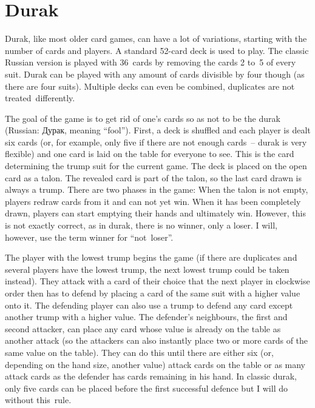 \documentclass[a4paper,titlepage]{article}
\begin{document}
\newpage

\section{Durak}

Durak, like most older card games, can have a lot of variations, starting with the number of cards and players. A standard 52-card deck is used to play. The classic Russian version is played with 36~cards by removing the cards 2 to~5 of every suit. Durak can be played with any amount of cards divisible by four though (as there are four suits). Multiple decks can even be combined, duplicates are not treated~differently.

The goal of the game is to get rid of one's cards so as not to be the durak (Russian: Дурак, meaning ``fool''). First, a deck is shuffled and each player is dealt six cards (or, for example, only five if there are not enough cards~-- durak is very flexible) and one card is laid on the table for everyone to see. This is the card determining the trump suit for the current game. The deck is placed on the open card as a talon. The revealed card is part of the talon, so the last card drawn is always a trump.
There are two phases in the game: When the talon is not empty, players redraw cards from it and can not yet win. When it has been completely drawn, players can start emptying their hands and ultimately win. However, this is not exactly correct, as in durak, there is no winner, only a loser. I will, however, use the term winner for ``not~loser''. \medskip

The player with the lowest trump begins the game (if there are duplicates and several players have the lowest trump, the next lowest trump could be taken instead). They attack with a card of their choice that the next player in clockwise order then has to defend by placing a card of the same suit with a higher value onto it. The defending player can also use a trump to defend any card except another trump with a higher value. The defender's neighbours, the first and second attacker, can place any card whose value is already on the table as another attack (so the attackers can also instantly place two or more cards of the same value on the table). They can do this until there are either six (or, depending on the hand size, another value) attack cards on the table or as many attack cards as the defender has cards remaining in his hand. In classic durak, only five cards can be placed before the first successful defence but I will do without this~rule.
\end{document}
